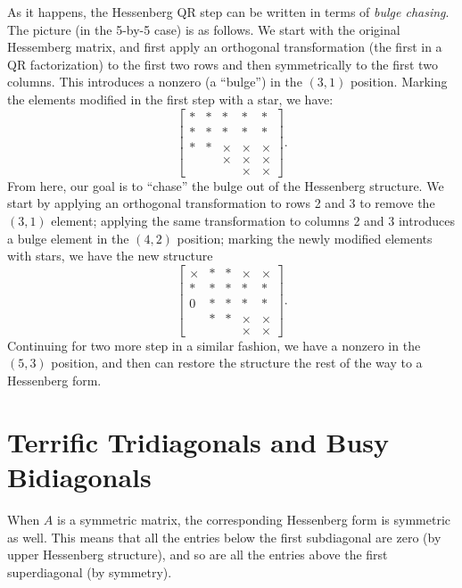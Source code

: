 \documentclass[12pt, leqno]{article} %
\begin{document}
As it happens, the Hessenberg QR step can be written in terms of {\em
  bulge chasing}.  The picture (in the 5-by-5 case) is as follows.  We
start with the original Hessemberg matrix, and first apply an
orthogonal transformation (the first in a QR factorization) to the
first two rows and then symmetrically to the first two columns.  This
introduces a nonzero (a ``bulge'') in the $(3,1)$ position.  Marking
the elements modified in the first step with a star, we have:
\[
  \begin{bmatrix}
    * & * & * & * & * \\
    * & * & * & * & * \\
    * & * & \times & \times & \times \\
           &        & \times & \times & \times \\
           &        &        & \times & \times
  \end{bmatrix}.
\]
From here, our goal is to ``chase'' the bulge out of the Hessenberg
structure.  We start by applying an orthogonal transformation to rows
2 and 3 to remove the $(3,1)$ element; applying the same
transformation to columns 2 and 3 introduces a bulge element in the
$(4,2)$ position; marking the newly modified elements with stars,
we have the new structure
\[
  \begin{bmatrix}
    \times & * & * & \times & \times \\
    * & * & * & * & * \\
    0 & * & * & * & * \\
           & * & * & \times & \times \\
           &        &        & \times & \times
  \end{bmatrix}.
\]
Continuing for two more step in a similar fashion, we have a nonzero
in the $(5,3)$ position, and then can restore the structure the rest
of the way to a Hessenberg form.

\section{Terrific Tridiagonals and Busy Bidiagonals}

When $A$ is a symmetric matrix, the corresponding Hessenberg form
is symmetric as well.  This means that all the entries
below the first subdiagonal are zero (by upper Hessenberg structure),
and so are all the entries above the first superdiagonal (by
symmetry).
\end{document}
